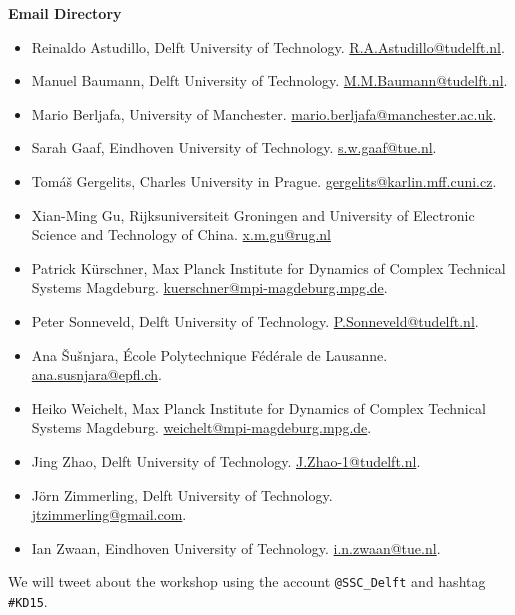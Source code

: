 \documentclass{article}
\begin{document}
\null\vfill\eject\thispagestyle{empty}\null\vfill\eject 












\newpage
\large{\textbf{Email Directory}}
\begin{itemize}
\item Reinaldo Astudillo, Delft University of Technology. \href{mailto:R.A.Astudillo@tudelft.nl}{R.A.Astudillo@tudelft.nl}.
\item Manuel Baumann, Delft University of Technology. \href{mailto:M.M.Baumann@tudelft.nl}{M.M.Baumann@tudelft.nl}.
\item Mario Berljafa, University of Manchester. \href{mailto:mario.berljafa@manchester.ac.uk}{mario.berljafa@manchester.ac.uk}.
\item Sarah Gaaf, Eindhoven University of Technology. \href{mailto:s.w.gaaf@tue.nl}{s.w.gaaf@tue.nl}.
\item Tom{\'a}{\v s} Gergelits, Charles University in Prague. \href{mailto:gergelits@karlin.mff.cuni.cz}{gergelits@karlin.mff.cuni.cz}.
\item Xian-Ming Gu, Rijksuniversiteit Groningen and University of
Electronic Science and Technology of China. \href{mailto:x.m.gu@rug.nl}{x.m.gu@rug.nl}
\item Patrick K\"{u}rschner, Max Planck Institute for Dynamics of Complex
Technical Systems Magdeburg. \href{mailto:kuerschner@mpi-magdeburg.mpg.de}{kuerschner@mpi-magdeburg.mpg.de}.
\item Peter Sonneveld, Delft University of Technology. \href{mailto:P.Sonneveld@tudelft.nl}{P.Sonneveld@tudelft.nl}.
\item Ana {\v S}u{\v s}njara, \'{E}cole Polytechnique F\'ed\'erale de Lausanne. \href{mailto:ana.susnjara@epfl.ch}{ana.susnjara@epfl.ch}.
\item Heiko Weichelt, Max Planck Institute for Dynamics of Complex
Technical Systems Magdeburg. \href{mailto:weichelt@mpi-magdeburg.mpg.de}{weichelt@mpi-magdeburg.mpg.de}.
\item Jing Zhao, Delft University of Technology. \href{mailto:J.Zhao-1@tudelft.nl}{J.Zhao-1@tudelft.nl}.
\item J\"orn Zimmerling, Delft University of Technology. \\ \href{mailto:jtzimmerling@gmail.com}{jtzimmerling@gmail.com}.
\item Ian Zwaan, Eindhoven University of Technology. \href{mailto:i.n.zwaan@tue.nl}{i.n.zwaan@tue.nl}.
\end{itemize}
\bigskip
We will tweet about the workshop using the account \texttt{@SSC\_Delft} and hashtag \texttt{\#KD15}.
\end{document}
